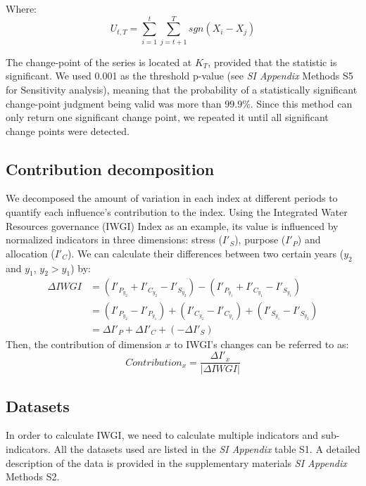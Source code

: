 		Where:
		\begin{equation}
			U_{t, T} = \sum_{i=1}^t\sum_{j=t+1}^T sgn(X_i - X_j)
		\end{equation}

		The change-point of the series is located at $K_T$, provided that the statistic is significant. We used 0.001 as the threshold p-value (see \textit{SI Appendix} Methods S5 for Sensitivity analysis), meaning that the probability of a statistically significant change-point judgment being valid was more than $99.9\%$.
		Since this method can only return one significant change point, we repeated it until all significant change points were detected.

	\subsection{Contribution decomposition}
		We decomposed the amount of variation in each index at different periods to quantify each influence's contribution to the index. Using the Integrated Water Resources governance (IWGI) Index as an example, its value is influenced by normalized indicators in three dimensions: stress ($I'_S$), purpose ($I'_P$) and allocation ($I'_C$). We can calculate their differences between two certain years ($y_2$ and $y_1$, $y_2 > y_1$) by:
		\begin{align}
		\Delta IWGI &= (I'_{P_{y_2}} + I'_{C_{y_2}} - I'_{S_{y_2}}) - (I'_{P_{y_1}} + I'_{C_{y_1}} - I'_{S_{y_1}}) \\
		&= (I'_{P_{y_2}} - I'_{P_{y_1}}) + (I'_{C_{y_2}} - I'_{C_{y_1}}) + (I'_{S_{y_1}} - I'_{S_{y_2}}) \\
		&= \Delta I'_P + \Delta I'_C + (-\Delta I'_S)
		\end{align}
		Then, the contribution of dimension $x$ to IWGI's changes can be referred to as:
		\begin{equation}
			Contribution_x = \frac{\Delta I'_x}{\lvert \Delta IWGI \rvert}
		\end{equation}



	\subsection{Datasets}
	In order to calculate IWGI, we need to calculate multiple indicators and sub-indicators. All the datasets used are listed in the \textit{SI Appendix} table S1. A detailed description of the data is provided in the supplementary materials \textit{SI Appendix} Methods S2.
